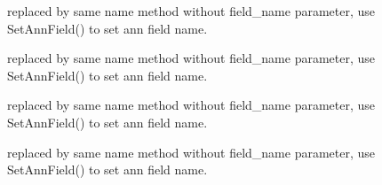 \begin{DoxyRefList}
%
replaced by same name method without field\+\_\+name parameter, use Set\+Ann\+Field() to set ann field name.  
\item[Member \mbox{\hyperlink{classmilvus_1_1_search_request_base_a4105db78847621e7aa14fbe26155436e}{milvus\+::Search\+Request\+Base\+::Add\+Int8\+Vector}} (std\+::string field\+\_\+name, const \mbox{\hyperlink{classmilvus_1_1_field_data_a921c839e5d8df646cb7a20029ddb17f6}{Int8\+Vec\+Field\+Data\+::\+ElementT}} \&vector)]\label{deprecated__deprecated000053}%
%
replaced by same name method without field\+\_\+name parameter, use Set\+Ann\+Field() to set ann field name.  
\item[Member \mbox{\hyperlink{classmilvus_1_1_search_request_base_aae6e3b726a1407de8495f3a338250818}{milvus\+::Search\+Request\+Base\+::Add\+Sparse\+Vector}} (std\+::string field\+\_\+name, const \mbox{\hyperlink{classmilvus_1_1_field_data_a921c839e5d8df646cb7a20029ddb17f6}{Sparse\+Float\+Vec\+Field\+Data\+::\+ElementT}} \&vector)]\label{deprecated__deprecated000046}%
%
replaced by same name method without field\+\_\+name parameter, use Set\+Ann\+Field() to set ann field name.  
\item[Member \mbox{\hyperlink{classmilvus_1_1_search_request_base_ab85ab368007c509daeca92cbc730c13a}{milvus\+::Search\+Request\+Base\+::Add\+Sparse\+Vector}} (std\+::string field\+\_\+name, const nlohmann\+::json \&vector)]\label{deprecated__deprecated000047}%
%
replaced by same name method without field\+\_\+name parameter, use Set\+Ann\+Field() to set ann field name. 
\end{DoxyRefList}